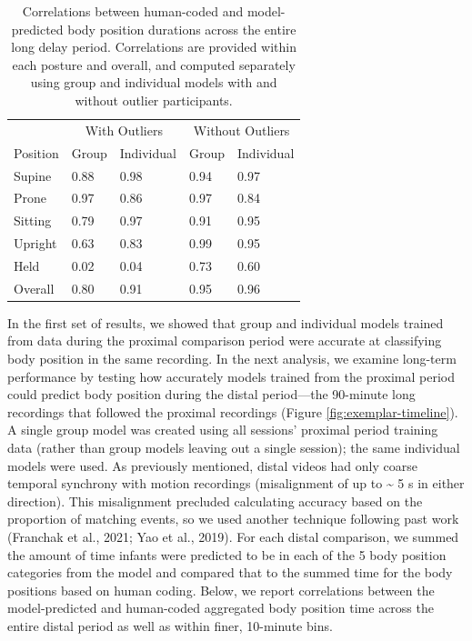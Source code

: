 \documentclass[
  man]{apa6}
\begin{document}
\begin{table}[tbp]

\begin{center}
\begin{threeparttable}

\caption{\label{tab:pt2overalltable}Correlations between human-coded and model-predicted body position durations across the entire long delay period. Correlations are provided within each posture and overall, and computed separately using group and individual models with and without outlier participants.}

\begin{tabular}{lllll}
\toprule
 & \multicolumn{2}{c}{With Outliers} & \multicolumn{2}{c}{Without Outliers} \\
\cmidrule(r){2-3} \cmidrule(r){4-5}
Position & Group & Individual & Group & Individual\\
\midrule
Supine & 0.88 & 0.98 & 0.94 & 0.97\\
Prone & 0.97 & 0.86 & 0.97 & 0.84\\
Sitting & 0.79 & 0.97 & 0.91 & 0.95\\
Upright & 0.63 & 0.83 & 0.99 & 0.95\\
Held & 0.02 & 0.04 & 0.73 & 0.60\\ \midrule
Overall & 0.80 & 0.91 & 0.95 & 0.96\\
\bottomrule
\end{tabular}

\end{threeparttable}
\end{center}

\end{table}

In the first set of results, we showed that group and individual models trained from data during the proximal comparison period were accurate at classifying body position in the same recording. In the next analysis, we examine long-term performance by testing how accurately models trained from the proximal period could predict body position during the distal period---the 90-minute long recordings that followed the proximal recordings (Figure \ref{fig:exemplar-timeline}). A single group model was created using all sessions' proximal period training data (rather than group models leaving out a single session); the same individual models were used. As previously mentioned, distal videos had only coarse temporal synchrony with motion recordings (misalignment of up to \textasciitilde{} 5 s in either direction). This misalignment precluded calculating accuracy based on the proportion of matching events, so we used another technique following past work (Franchak et al., 2021; Yao et al., 2019). For each distal comparison, we summed the amount of time infants were predicted to be in each of the 5 body position categories from the model and compared that to the summed time for the body positions based on human coding. Below, we report correlations between the model-predicted and human-coded aggregated body position time across the entire distal period as well as within finer, 10-minute bins.
\end{document}
